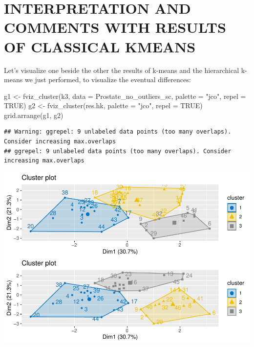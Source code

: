 \documentclass[
]{article}
\newenvironment{Shaded}{\begin{snugshade}}{\end{snugshade}}
\newcommand{\AttributeTok}[1]{\textcolor[rgb]{0.77,0.63,0.00}{#1}}
\newcommand{\ConstantTok}[1]{\textcolor[rgb]{0.00,0.00,0.00}{#1}}
\newcommand{\FunctionTok}[1]{\textcolor[rgb]{0.00,0.00,0.00}{#1}}
\newcommand{\NormalTok}[1]{#1}
\newcommand{\OtherTok}[1]{\textcolor[rgb]{0.56,0.35,0.01}{#1}}
\newcommand{\StringTok}[1]{\textcolor[rgb]{0.31,0.60,0.02}{#1}}
\begin{document}
\hypertarget{interpretation-and-comments-with-results-of-classical-kmeans}{%
\section{INTERPRETATION AND COMMENTS WITH RESULTS OF CLASSICAL
KMEANS}\label{interpretation-and-comments-with-results-of-classical-kmeans}}

Let's visualize one beside the other the results of k-means and the
hierarchical k-means we just performed, to visualize the eventual
differences:

\begin{Shaded}
\begin{Highlighting}[]
\NormalTok{g1 }\OtherTok{\textless{}{-}} \FunctionTok{fviz\_cluster}\NormalTok{(k3,  }\AttributeTok{data =}\NormalTok{ Prostate\_no\_outliers\_sc, }\AttributeTok{palette =} \StringTok{"jco"}\NormalTok{, }\AttributeTok{repel =} \ConstantTok{TRUE}\NormalTok{)}
\NormalTok{g2 }\OtherTok{\textless{}{-}} \FunctionTok{fviz\_cluster}\NormalTok{(res.hk, }\AttributeTok{palette =} \StringTok{"jco"}\NormalTok{, }\AttributeTok{repel =} \ConstantTok{TRUE}\NormalTok{)}
\FunctionTok{grid.arrange}\NormalTok{(g1, g2)}
\end{Highlighting}
\end{Shaded}

\begin{verbatim}
## Warning: ggrepel: 9 unlabeled data points (too many overlaps). Consider increasing max.overlaps
## ggrepel: 9 unlabeled data points (too many overlaps). Consider increasing max.overlaps
\end{verbatim}

\includegraphics{clustering_files/figure-latex/unnamed-chunk-71-1.pdf}
\end{document}
